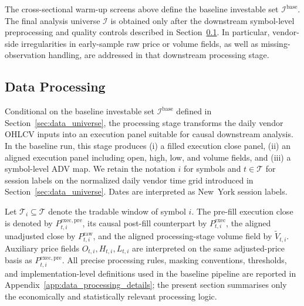 \documentclass[11pt,a4paper]{article}
\begin{document}
The cross-sectional warm-up screens above define the baseline investable set
$\mathcal{I}^{\mathrm{base}}$. The final analysis universe $\mathcal{I}$ is obtained
only after the downstream symbol-level preprocessing and quality controls described
in Section~\ref{sec:data_processing}. In particular, vendor-side irregularities in
early-sample raw price or volume fields, as well as missing-observation handling,
are addressed in that downstream processing stage.

\subsection{Data Processing}\label{sec:data_processing}

Conditional on the baseline investable set \(\mathcal{I}^{\mathrm{base}}\) defined
in Section~\ref{sec:data_universe}, the processing stage transforms the daily
vendor OHLCV inputs into an execution panel suitable for causal downstream
analysis. In the baseline run, this stage produces (i) a filled execution close
panel, (ii) an aligned execution panel including open, high, low, and volume
fields, and (iii) a symbol-level ADV map. We retain the notation \(i\) for
symbols and \(t \in \mathcal{T}\) for session labels on the normalized daily
vendor time grid introduced in Section~\ref{sec:data_universe}. Dates are
interpreted as New~York session labels.

Let \(\mathcal{T}_i \subseteq \mathcal{T}\) denote the tradable window of symbol
\(i\). The pre-fill execution close is denoted by
\(P^{\mathrm{exec,pre}}_{t,i}\), its causal post-fill counterpart by
\(P^{\mathrm{exec}}_{t,i}\), the aligned unadjusted close by
\(P^{\mathrm{raw}}_{t,i}\), and the aligned processing-stage volume field by
\(\widetilde V_{t,i}\). Auxiliary price fields \(O_{t,i}, H_{t,i}, L_{t,i}\)
are interpreted on the same adjusted-price basis as
\(P^{\mathrm{exec,pre}}_{t,i}\). All precise processing rules, masking
conventions, thresholds, and implementation-level definitions used in the
baseline pipeline are reported in
Appendix~\ref{app:data_processing_details}; the present section summarises only
the economically and statistically relevant processing logic.
\end{document}
